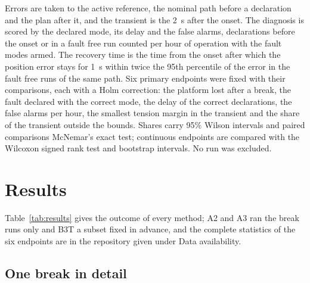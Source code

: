 \documentclass{interact}
\begin{document}
Errors are taken to the active reference, the nominal path before a declaration and the plan after it, and the transient is the 2~s after the onset. The diagnosis is scored by the declared mode, its delay and the false alarms, declarations before the onset or in a fault free run counted per hour of operation with the fault modes armed. The recovery time is the time from the onset after which the position error stays for 1~s within twice the 95th percentile of the error in the fault free runs of the same path. Six primary endpoints were fixed with their comparisons, each with a Holm correction: the platform lost after a break, the fault declared with the correct mode, the delay of the correct declarations, the false alarms per hour, the smallest tension margin in the transient and the share of the transient outside the bounds. Shares carry 95\% Wilson intervals and paired comparisons McNemar's exact test; continuous endpoints are compared with the Wilcoxon signed rank test and bootstrap intervals. No run was excluded.

\section{Results}\label{sec:results}

Table~\ref{tab:results} gives the outcome of every method; A2 and A3 ran the break runs only and B3T a subset fixed in advance, and the complete statistics of the six endpoints are in the repository given under Data availability.



\subsection{One break in detail}\label{sec:example}
\end{document}
